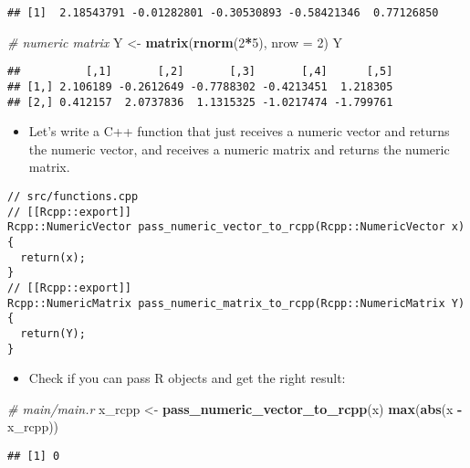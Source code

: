 \documentclass[
]{book}
\newenvironment{Shaded}{\begin{snugshade}}{\end{snugshade}}
\newcommand{\CommentTok}[1]{\textcolor[rgb]{0.56,0.35,0.01}{\textit{#1}}}
\newcommand{\DataTypeTok}[1]{\textcolor[rgb]{0.13,0.29,0.53}{#1}}
\newcommand{\DecValTok}[1]{\textcolor[rgb]{0.00,0.00,0.81}{#1}}
\newcommand{\KeywordTok}[1]{\textcolor[rgb]{0.13,0.29,0.53}{\textbf{#1}}}
\newcommand{\NormalTok}[1]{#1}
\newcommand{\OperatorTok}[1]{\textcolor[rgb]{0.81,0.36,0.00}{\textbf{#1}}}
\newcommand{\StringTok}[1]{\textcolor[rgb]{0.31,0.60,0.02}{#1}}
\providecommand{\tightlist}{%
  \setlength{\itemsep}{0pt}\setlength{\parskip}{0pt}}
\begin{document}
\begin{verbatim}
## [1]  2.18543791 -0.01282801 -0.30530893 -0.58421346  0.77126850
\end{verbatim}

\begin{Shaded}
\begin{Highlighting}[]
\CommentTok{# numeric matrix}
\NormalTok{Y <-}\StringTok{ }\KeywordTok{matrix}\NormalTok{(}\KeywordTok{rnorm}\NormalTok{(}\DecValTok{2}\OperatorTok{*}\DecValTok{5}\NormalTok{), }\DataTypeTok{nrow =} \DecValTok{2}\NormalTok{)}
\NormalTok{Y}
\end{Highlighting}
\end{Shaded}

\begin{verbatim}
##          [,1]       [,2]       [,3]       [,4]      [,5]
## [1,] 2.106189 -0.2612649 -0.7788302 -0.4213451  1.218305
## [2,] 0.412157  2.0737836  1.1315325 -1.0217474 -1.799761
\end{verbatim}

\begin{itemize}
\tightlist
\item
  Let's write a C++ function that just receives a numeric vector and returns the numeric vector, and receives a numeric matrix and returns the numeric matrix.
\end{itemize}

\begin{verbatim}
// src/functions.cpp
// [[Rcpp::export]]
Rcpp::NumericVector pass_numeric_vector_to_rcpp(Rcpp::NumericVector x) {
  return(x);
}
// [[Rcpp::export]]
Rcpp::NumericMatrix pass_numeric_matrix_to_rcpp(Rcpp::NumericMatrix Y) {
  return(Y);
}
\end{verbatim}

\begin{itemize}
\tightlist
\item
  Check if you can pass R objects and get the right result:
\end{itemize}

\begin{Shaded}
\begin{Highlighting}[]
\CommentTok{# main/main.r}
\NormalTok{x_rcpp <-}\StringTok{ }\KeywordTok{pass_numeric_vector_to_rcpp}\NormalTok{(x)}
\KeywordTok{max}\NormalTok{(}\KeywordTok{abs}\NormalTok{(x }\OperatorTok{-}\StringTok{ }\NormalTok{x_rcpp))}
\end{Highlighting}
\end{Shaded}

\begin{verbatim}
## [1] 0
\end{verbatim}
\end{document}
